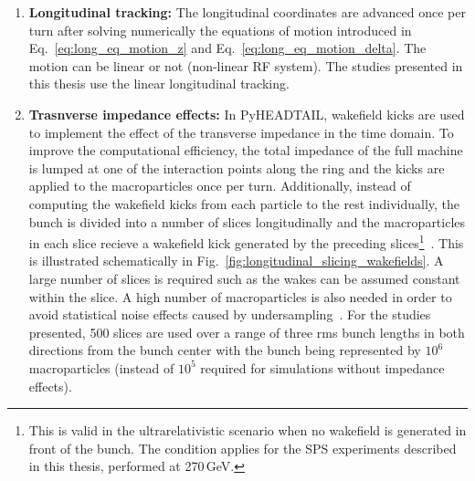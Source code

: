 {\begin{enumerate}
\begin{equation}
    \end{equation}
    where $i=1, ..., N$ with $N$ being the number of macroparticles, $\Delta \psi_{x, \mathrm{IP0 \to IP1 }}$ is the phase advance for all macroparticles defined in the previous step, $\xi_x^{1}$ the horizontal chromaticity of first order (see Eq.~\eqref{eq:chroma_up_to_order_m} for $n=1$) normalised to the betatron tune, $\alpha_{xx}$ and $\alpha_{xy}$ are the detuning coefficients, while $J_x$ and $J_y$ are the horizontal and vertical actions of the macroparticle. Therefore, in the presence of detuning the elements of the $M$ matrix (introduced in Eq.~\eqref{eq:linear_transfer_matrix}) are different for every particle.

    \item \textbf{Longitudinal tracking:}  %
    The longitudinal coordinates are advanced once per turn after solving numerically the equations of motion introduced in Eq.~\eqref{eq:long_eq_motion_z} and Eq.~\eqref{eq:long_eq_motion_delta}. The motion can be linear or not (non-linear RF system). The studies presented in this thesis use the linear longitudinal tracking.

    \item \textbf{Trasnverse impedance effects:} In PyHEADTAIL, wakefield kicks are used to implement the effect of the transverse impedance in the time domain. To improve the computational efficiency, the total impedance of the full machine is lumped at one of the interaction points along the ring and the kicks are applied to the macroparticles once per turn. Additionally, instead of computing the wakefield kicks from each particle to the rest individually, the bunch is divided into a number of slices longitudinally and the macroparticles in each slice recieve a wakefield kick generated by the preceding slices\footnote{This is valid in the ultrarelativistic scenario when no wakefield is generated in front of the bunch. The condition applies for the SPS experiments described in this thesis, performed at 270\,GeV.}~\cite{Salvant:1274254}. This is illustrated schematically in Fig.~\ref{fig:longitudinal_slicing_wakefields}. A large number of slices is required such as the wakes can be assumed constant within the slice. A high number of macroparticles is also needed in order to avoid statistical noise effects caused by undersampling~\cite{pyheadtail_manual_adrian}. For the studies presented, 500 slices are used over a range of three rms bunch lengths in both directions from the bunch center with the bunch being represented by $10^6$ macroparticles (instead of $10^5$ required for simulations without impedance effects).
    



\end{enumerate}}
